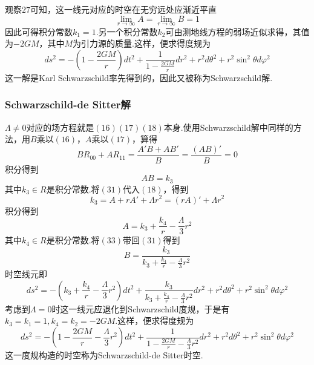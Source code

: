         观察$27$可知，这一线元对应的时空在无穷远处应渐近平直
        \begin{equation}
            {\lim_{r \to \infty}A}={\lim_{r \to \infty}B}=1
        \end{equation}
        因此可得积分常数$k_1=1$.另一个积分常数$k_2$可由测地线方程的弱场近似求得，其值为$-2GM$，其中$M$为引力源的质量.这样，便求得度规为
        \begin{equation}
            ds^2=-\left(1-\frac{2GM}{r}\right)dt^2+\frac{1}{1-\frac{2GM}{r}}dr^2+r^2d\theta^2+r^2\sin^2\theta d\varphi^2
        \end{equation}
        这一解是Karl Schwarzschild率先得到的，因此又被称为Schwarzschild解.



        \subsubsection{Schwarzschild-de Sitter解}



        $\Lambda\ne0$对应的场方程就是$(16)(17)(18)$本身.使用Schwarzschild解中同样的方法，用$B$乘以$(16)$，$A$乘以$(17)$，算得
        \begin{equation}
            BR_{00}+AR_{11}=\frac{A'B+AB'}{B}=\frac{(AB)'}{B}=0
        \end{equation}
        积分得到
        \begin{equation}
            AB=k_3
        \end{equation}
        其中$k_3\in R$是积分常数.将$(31)$代入$(18)$，得到
        \begin{equation}
            k_3=A+rA'+\Lambda r^2=(rA)'+\Lambda r^2
        \end{equation}
        积分得到
        \begin{equation}
            A=k_3+\frac{k_4}{r}-\frac{\Lambda}{3}r^2
        \end{equation}
        其中$k_4\in R$是积分常数.将$(33)$带回$(31)$得到
        \begin{equation}
            B=\frac{k_3}{k_3+\frac{k_4}{r}-\frac{\Lambda}{3}r^2}
        \end{equation}
        时空线元即
        \begin{equation}
            ds^2=-\left(k_3+\frac{k_4}{r}-\frac{\Lambda}{3}r^2\right)dt^2+\frac{k_3}{k_3+\frac{k_4}{r}-\frac{\Lambda}{3}r^2}dr^2+r^2d\theta^2+r^2\sin^2\theta d\varphi^2
        \end{equation}
        考虑到$\Lambda=0$时这一线元应退化到Schwarzschild度规，于是有$k_3=k_1=1,k_4=k_2=-2GM$.这样，便求得度规为
        \begin{equation}
            ds^2=-\left(1-\frac{2GM}{r}-\frac{\Lambda}{3}r^2\right)dt^2+\frac{1}{1-\frac{2GM}{r}-\frac{\Lambda}{3}r^2}dr^2+r^2d\theta^2+r^2\sin^2\theta d\varphi^2
        \end{equation}
        这一度规构造的时空称为Schwarzschild-de Sitter时空.